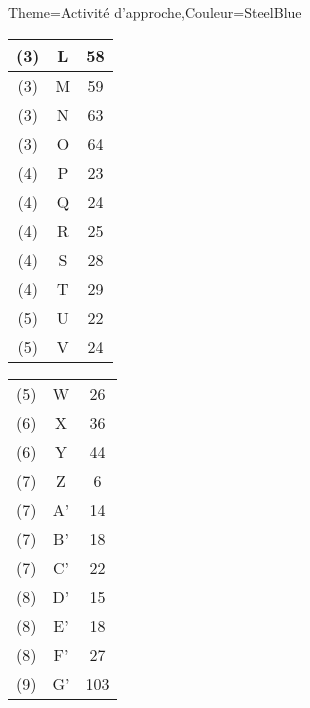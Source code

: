 \begin{Maquette}[Cours]{Theme={Activité d'approche},Couleur={SteelBlue}}
\begin{AActivite}
\begin{center}
{\begin{tabular}{|*{3}{C{0.9}|}}
                  \hline
                  (3) &  L & 58 \\
                  \hline
                  (3) & M & 59 \\
                  \hline
                  (3) & N & 63 \\
                  \hline
                  (3) & O & 64 \\
                  \hline
                  (4) & P & 23 \\
                  \hline
                  (4) & Q & 24 \\
                  \hline
                  (4) & R & 25 \\
                  \hline
                  (4) & S & 28 \\
                  \hline
                  (4) & T & 29 \\
                  \hline
                  (5) & U & 22 \\
                  \hline
                  (5) & V & 24 \\
                  \hline
               \end{tabular}
               \hfill
               \begin{tabular}{|*{3}{C{0.9}|}}
                  \hline
                   &  &  \\
                  \hline
                  (5) & W & 26 \\
                  \hline
                  (6) & X & 36 \\
                  \hline
                  (6) & Y & 44 \\
                  \hline
                  (7) & Z & 6 \\
                  \hline
                  (7) & A' & 14 \\
                  \hline
                  (7) & B' & 18 \\
                  \hline
                  (7) & C' & 22 \\
                  \hline
                  (8) & D' & 15 \\
                  \hline
                  (8) & E' & 18 \\
                  \hline
                  (8) & F' & 27 \\
                  \hline
                  (9) & G' & 103 \\
                  \hline

\end{tabular}}
\end{center}
\end{AActivite}
\end{Maquette}
